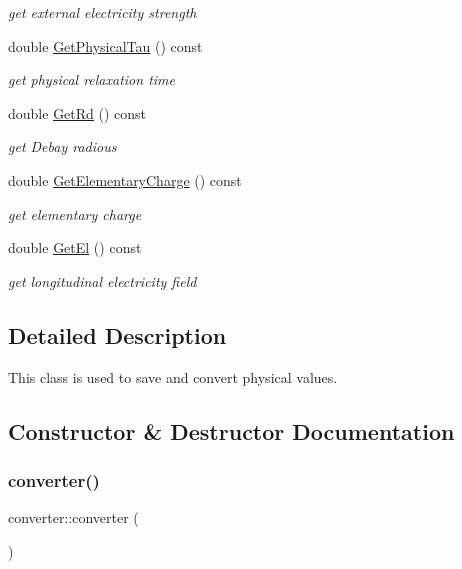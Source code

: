 \begin{DoxyCompactItemize}
\begin{DoxyCompactList}\small\item\em get external electricity strength \end{DoxyCompactList}\item 
double \mbox{\hyperlink{classconverter_a940ed6e249e1ba3be2d64e1502ea3e84}{Get\+Physical\+Tau}} () const
\begin{DoxyCompactList}\small\item\em get physical relaxation time \end{DoxyCompactList}\item 
double \mbox{\hyperlink{classconverter_a93ee05bf68e6f98cefc0ec0236b9a58e}{Get\+Rd}} () const
\begin{DoxyCompactList}\small\item\em get Debay radious \end{DoxyCompactList}\item 
double \mbox{\hyperlink{classconverter_a6153436879355be9e92b477918bd1e2b}{Get\+Elementary\+Charge}} () const
\begin{DoxyCompactList}\small\item\em get elementary charge \end{DoxyCompactList}\item 
double \mbox{\hyperlink{classconverter_a9d68bca358ad6090dbdac200c94c251b}{Get\+El}} () const
\begin{DoxyCompactList}\small\item\em get longitudinal electricity field \end{DoxyCompactList}\end{DoxyCompactItemize}


\subsection{Detailed Description}
This class is used to save and convert physical values. 

\subsection{Constructor \& Destructor Documentation}
\mbox{\label{classconverter_a739bb1c56d40ec92d168670fa96743eb}} 
\subsubsection{\texorpdfstring{converter()}{converter()}\hspace{0.1cm}{\footnotesize\ttfamily [1/2]}}
{\footnotesize\ttfamily converter\+::converter (\begin{DoxyParamCaption}{ }\end{DoxyParamCaption})}



